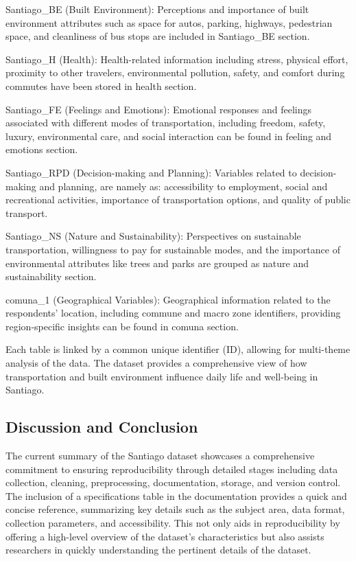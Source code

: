 \documentclass[
]{article}
\begin{document}
Santiago\_BE (Built Environment): Perceptions and importance of built
environment attributes such as space for autos, parking, highways,
pedestrian space, and cleanliness of bus stops are included in
Santiago\_BE section.

Santiago\_H (Health): Health-related information including stress,
physical effort, proximity to other travelers, environmental pollution,
safety, and comfort during commutes have been stored in health section.

Santiago\_FE (Feelings and Emotions): Emotional responses and feelings
associated with different modes of transportation, including freedom,
safety, luxury, environmental care, and social interaction can be found
in feeling and emotions section.

Santiago\_RPD (Decision-making and Planning): Variables related to
decision-making and planning, are namely as: accessibility to
employment, social and recreational activities, importance of
transportation options, and quality of public transport.

Santiago\_NS (Nature and Sustainability): Perspectives on sustainable
transportation, willingness to pay for sustainable modes, and the
importance of environmental attributes like trees and parks are grouped
as nature and sustainability section.

comuna\_1 (Geographical Variables): Geographical information related to
the respondents' location, including commune and macro zone identifiers,
providing region-specific insights can be found in comuna section.

Each table is linked by a common unique identifier (ID), allowing for
multi-theme analysis of the data. The dataset provides a comprehensive
view of how transportation and built environment influence daily life
and well-being in Santiago.

\hypertarget{discussion-and-conclusion}{%
\subsection{Discussion and Conclusion}\label{discussion-and-conclusion}}

The current summary of the Santiago dataset showcases a comprehensive
commitment to ensuring reproducibility through detailed stages including
data collection, cleaning, preprocessing, documentation, storage, and
version control. The inclusion of a specifications table in the
documentation provides a quick and concise reference, summarizing key
details such as the subject area, data format, collection parameters,
and accessibility. This not only aids in reproducibility by offering a
high-level overview of the dataset's characteristics but also assists
researchers in quickly understanding the pertinent details of the
dataset.
\end{document}
